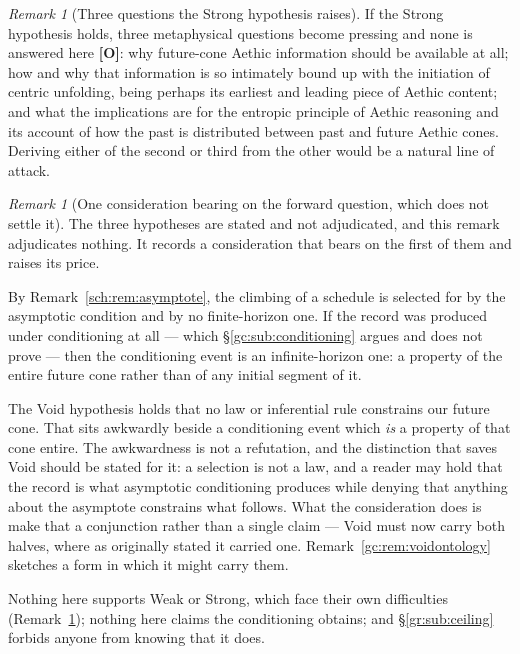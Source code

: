 \documentclass[11pt]{article}
\numberwithin{equation}{section}
\theoremstyle{plain}
\theoremstyle{definition}
\theoremstyle{remark}
\newtheorem{remark}[theorem]{Remark}
\begin{document}
\begin{remark}[Three questions the Strong hypothesis raises]
\label{gc:rem:strongquestions}
If the Strong hypothesis holds, three metaphysical questions become
pressing and none is answered here \textbf{[O]}: why future-cone Aethic
information should be available at all; how and why that information is
so intimately bound up with the initiation of centric unfolding, being
perhaps its earliest and leading piece of Aethic content; and what the
implications are for the entropic principle of Aethic reasoning and its
account of how the past is distributed between past and future Aethic
cones. Deriving either of the second or third from the other would be a
natural line of attack.
\end{remark}

\begin{remark}[One consideration bearing on the forward question, which
does not settle it]\label{gc:rem:asymptoteextrap}
The three hypotheses are stated and not adjudicated, and this remark
adjudicates nothing. It records a consideration that bears on the first
of them and raises its price.

By Remark~\ref{sch:rem:asymptote}, the climbing of a schedule is
selected for by the asymptotic condition and by no finite-horizon one.
If the record was produced under conditioning at all --- which
\S\ref{gc:sub:conditioning} argues and does not prove --- then the
conditioning event is an infinite-horizon one: a property of the entire
future cone rather than of any initial segment of it.

The Void hypothesis holds that no law or inferential rule constrains our
future cone. That sits awkwardly beside a conditioning event which
\emph{is} a property of that cone entire. The awkwardness is not a
refutation, and the distinction that saves Void should be stated for it:
a selection is not a law, and a reader may hold that the record is what
asymptotic conditioning produces while denying that anything about the
asymptote constrains what follows. What the consideration does is make
that a conjunction rather than a single claim --- Void must now carry
both halves, where as originally stated it carried one.
Remark~\ref{gc:rem:voidontology} sketches a form in which it might carry
them.

Nothing here supports Weak or Strong, which face their own difficulties
(Remark~\ref{gc:rem:strongquestions}); nothing here claims the
conditioning obtains; and \S\ref{gr:sub:ceiling} forbids anyone from
knowing that it does.
\end{remark}
\end{document}
